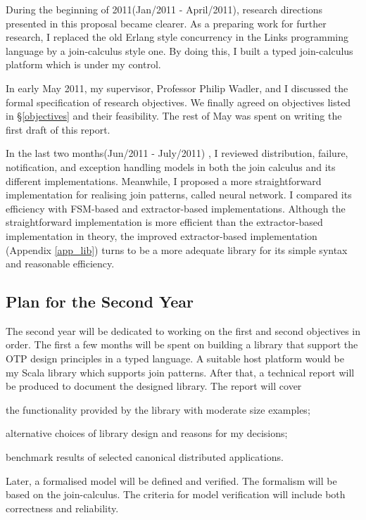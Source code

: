 During the beginning of  2011(Jan/2011 - April/2011), research directions presented in this proposal became clearer.  As a preparing work for further research, I replaced the old Erlang style concurrency in the Links programming language by a join-calculus style one.  By doing this, I built a typed join-calculus platform which is under my control.  

In early May 2011, my supervisor, Professor Philip Wadler, and I discussed the formal specification of research objectives.  We  finally agreed on objectives listed in \S\ref{objectives} and their feasibility.  The rest of May was spent on writing the first draft of this report.

In the last two months(Jun/2011 - July/2011) , I reviewed distribution, failure, notification, and exception handling models in both the join calculus and its different implementations.  Meanwhile, I proposed a more straightforward implementation for realising join patterns, called neural network.  I compared its efficiency with FSM-based and extractor-based implementations.  Although the straightforward implementation is more efficient than the extractor-based implementation in theory, the improved extractor-based implementation (Appendix \ref{app_lib}) turns to be a more adequate library for its simple syntax and reasonable efficiency.

\subsection{Plan for the Second Year}
The second year will be dedicated to working on the first and second objectives in order.  The first a few months will be spent on building a library that support the OTP design principles in a typed language.  A suitable host platform would be my Scala library which supports join patterns.  After that, a technical report will be produced to document the designed library.  The report will cover
\begin{inparaenum}[(i)]
  \item the functionality provided by the library with moderate size examples;
  \item alternative choices of library design and reasons for my decisions;
  \item benchmark results of selected canonical distributed applications.
\end{inparaenum}  
Later, a formalised model will be defined and verified.  The formalism will be based on the join-calculus.  The criteria for model verification will include both correctness and reliability.


